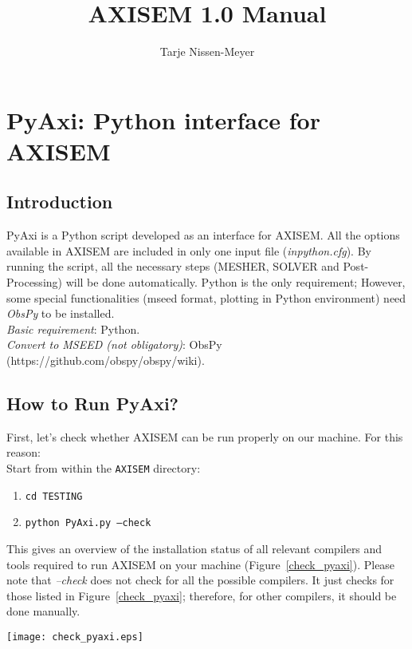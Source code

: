 \documentclass[11pt,letter,fleqn,english,notitlepage]{article}
\title{AXISEM 1.0 Manual}
\author{Tarje Nissen-Meyer}
\begin{document}
%
\pagestyle{fancy}
\thispagestyle{empty}
%

\section{PyAxi: Python interface for AXISEM}

\subsection{Introduction}
PyAxi is a Python script developed as an interface for AXISEM.
All the options available in AXISEM are included in only one input file (\textit{inpython.cfg}).
By running the script, all the necessary steps (MESHER, SOLVER and Post-Processing) will be done automatically.
Python is the only requirement; However, some special functionalities (mseed format, plotting in Python environment) need \textit{ObsPy} to be installed. \\

\noindent \textit{Basic requirement}: Python.\\
\textit{Convert to MSEED (not obligatory)}: ObsPy (https://github.com/obspy/obspy/wiki).\\

\subsection{How to Run PyAxi?}
First, let's check whether AXISEM can be run properly on our machine.
For this reason:\\

Start from within the {\tt AXISEM} directory:
\begin{enumerate}
\itemsep0em
\item {\tt cd TESTING}
\item {\tt python PyAxi.py --check}
\end{enumerate}
\noindent This gives an overview of the installation status of all relevant compilers and tools required
to run AXISEM on your machine (Figure~\ref{check_pyaxi}).
Please note that \textit{--check} does not check for all the possible compilers.
It just checks for those listed in Figure~\ref{check_pyaxi};
therefore, for other compilers, it should be done manually.\\

\begin{figure*}[htb]
\begin{center}
\texttt{[image: check\_pyaxi.eps]}
\end{center}
\caption{\textit{Checking all the relevant compilers and tools required to run AXISEM.}}
\label{check_pyaxi}
\end{figure*}
\end{document}
